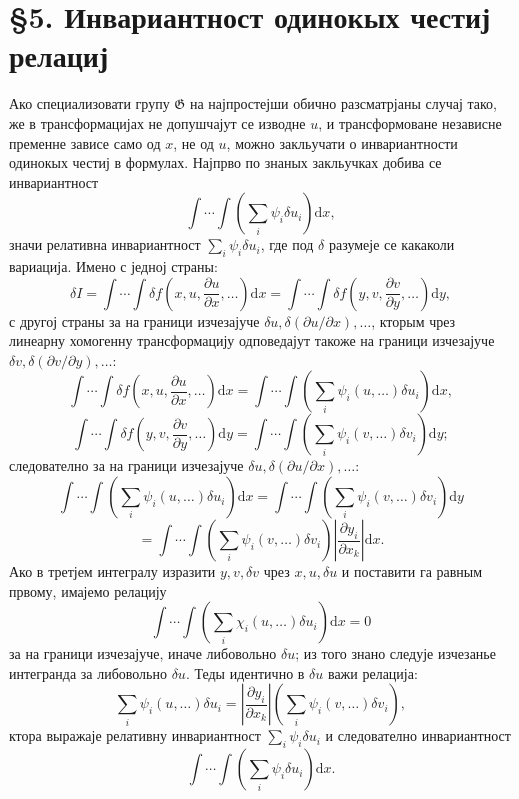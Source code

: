 ﻿\documentclass[11pt]{article}
\providecommand{\G}{\mathfrak G}
\providecommand{\p}{\partial}
\providecommand{\dd}{\mathrm d}
\begin{document}
\section*{\S{}5. Инвариантност одинокых честиј релациј}

Ако специализовати групу \(\G\) на најпростејши обично разсматрјаны случај тако, же в трансформацијах не допушчајут се изводне \(u\), и трансформоване независне пременне зависе само од \(x\), не од \(u\), можно закльучати о инвариантности одинокых честиј в формулах. Најпрво по знаных закльучках добива се инвариантност
\[
\int\!\cdots\!\int\left(\sum_i\psi_i\delta u_i\right)\dd x,
\]
значи релативна инвариантност \(\sum_i\psi_i\delta u_i\), где под \(\delta\) разумеје се какаколи вариација. Имено с једној страны:
\[
\delta I
=\int\!\cdots\!\int \delta f\!\left(x,u,\frac{\p u}{\p x},\ldots\right)\dd x
=\int\!\cdots\!\int \delta f\!\left(y,v,\frac{\p v}{\p y},\ldots\right)\dd y,
\]
с другој страны за на граници изчезајуче \(\delta u,\delta(\p u/\p x),\ldots\), кторым чрез линеарну хомогенну трансформацију одповедајут такоже на граници изчезајуче \(\delta v,\delta(\p v/\p y),\ldots\):
\[
\int\!\cdots\!\int \delta f\!\left(x,u,\frac{\p u}{\p x},\ldots\right)\dd x
=
\int\!\cdots\!\int\left(\sum_i\psi_i(u,\ldots)\delta u_i\right)\dd x,
\]
\[
\int\!\cdots\!\int \delta f\!\left(y,v,\frac{\p v}{\p y},\ldots\right)\dd y
=
\int\!\cdots\!\int\left(\sum_i\psi_i(v,\ldots)\delta v_i\right)\dd y;
\]
следователно за на граници изчезајуче \(\delta u,\delta(\p u/\p x),\ldots\):
\[
\int\!\cdots\!\int\left(\sum_i\psi_i(u,\ldots)\delta u_i\right)\dd x
=
\int\!\cdots\!\int\left(\sum_i\psi_i(v,\ldots)\delta v_i\right)\dd y
\]
\[
=
\int\!\cdots\!\int\left(\sum_i\psi_i(v,\ldots)\delta v_i\right)
\left|\frac{\p y_i}{\p x_k}\right|\dd x.
\]
Ако в третјем интегралу изразити \(y,v,\delta v\) чрез \(x,u,\delta u\) и поставити га равным првому, имајемо релацију
\[
\int\!\cdots\!\int\left(\sum_i\chi_i(u,\ldots)\delta u_i\right)\dd x=0
\]
за на граници изчезајуче, иначе либовольно \(\delta u\); из того знано следује изчезанье интегранда за либовольно \(\delta u\). Теды идентично в \(\delta u\) важи релација:
\[
\sum_i\psi_i(u,\ldots)\delta u_i
=
\left|\frac{\p y_i}{\p x_k}\right|
\left(\sum_i\psi_i(v,\ldots)\delta v_i\right),
\]
ктора выражаје релативну инвариантност \(\sum_i\psi_i\delta u_i\) и следователно инвариантност
\[
\int\!\cdots\!\int\left(\sum_i\psi_i\delta u_i\right)\dd x.
\]
\end{document}

